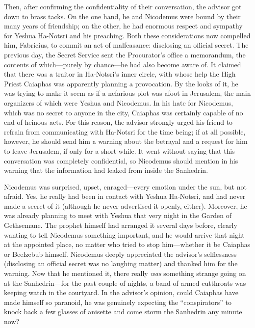 Then, after confirming the confidentiality of their conversation, the advisor got down to brass tacks. On the one hand, he and Nicodemus were bound by their many years of friendship; on the other, he had enormous respect and sympathy for Yeshua Ha-Notsri and his preaching. Both these considerations now compelled him, Fabricius, to commit an act of malfeasance: disclosing an official secret. The previous day, the Secret Service sent the Procurator's office a memorandum, the contents of which---purely by chance---he had also become aware of. It claimed that there was a traitor in Ha-Notsri's inner circle, with whose help the High Priest Caiaphas was apparently planning a provocation. By the looks of it, he was trying to make it seem as if a nefarious plot was afoot in Jerusalem, the main organizers of which were Yeshua and Nicodemus. In his hate for Nicodemus, which was no secret to anyone in the city, Caiaphas was certainly capable of no end of heinous acts. For this reason, the advisor strongly urged his friend to refrain from communicating with Ha-Notsri for the time being; if at all possible, however, he should send him a warning about the betrayal and a request for him to leave Jerusalem, if only for a short while. It went without saying that this conversation was completely confidential, so Nicodemus should mention in his warning that the information had leaked from inside the Sanhedrin.

Nicodemus was surprised, upset, enraged---every emotion under the sun, but not afraid. Yes, he really had been in contact with Yeshua Ha-Notsri, and had never made a secret of it (although he never advertised it openly, either). Moreover, he was already planning to meet with Yeshua that very night in the Garden of Gethsemane. The prophet himself had arranged it several days before, clearly wanting to tell Nicodemus something important, and he would arrive that night at the appointed place, no matter who tried to stop him---whether it be Caiaphas or Beelzebub himself. Nicodemus deeply appreciated the advisor's selflessness (disclosing an official secret was no laughing matter) and thanked him for the warning. Now that he mentioned it, there really \emph{was} something strange going on at the Sanhedrin---for the past couple of nights, a band of armed cutthroats was keeping watch in the courtyard. In the advisor's opinion, could Caiaphas have made himself so paranoid, he was genuinely expecting the ``conspirators'' to knock back a few glasses of anisette and come storm the Sanhedrin any minute now?

